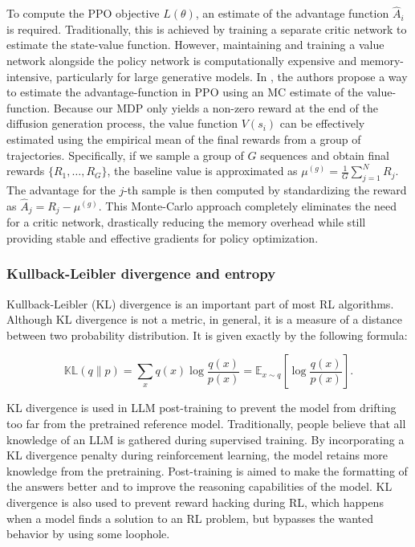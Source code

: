 To compute the PPO objective $L(\theta)$, an estimate of the advantage function $\hat{A}_i$ is required. Traditionally, this is achieved by training a separate critic network to estimate the state-value function. However, maintaining and training a value network alongside the policy network is computationally expensive and memory-intensive, particularly for large generative models. In \cite{shao2024deepseekmathpushinglimitsmathematical}, the authors propose a way to estimate the advantage-function in PPO using an MC estimate of the value-function. Because our MDP only yields a non-zero reward at the end of the diffusion generation process, the value function $V(s_i)$ can be effectively estimated using the empirical mean of the final rewards from a group of trajectories. Specifically, if we sample a group of $G$ sequences and obtain final rewards $\{R_1, \dots, R_G\}$, the baseline value is approximated as $\mu^{(g)} = \frac{1}{G}\sum_{j=1}^N R_j$. The advantage for the $j$-th sample is then computed by standardizing the reward as $\hat{A}_j = R_j - \mu^{(g)}$. This Monte-Carlo approach completely eliminates the need for a critic network, drastically reducing the memory overhead while still providing stable and effective gradients for policy optimization.


\subsubsection{Kullback-Leibler divergence and entropy}
\label{sec:kldivergence and entropy}

Kullback-Leibler (KL) divergence is an important part of most RL algorithms. Although KL divergence is not a metric, in general, it is a measure of a distance between two probability distribution. It is given exactly by the following formula:

\begin{equation*}
    \mathbb{KL}(q \parallel p) = \sum_{x}q(x)\log\frac{q(x)}{p(x)} = \mathbb{E}_{x\sim q}\left[\log\frac{q(x)}{p(x)}\right].
\end{equation*}

KL divergence is used in LLM post-training to prevent the model from drifting too far from the pretrained reference model. Traditionally, people believe that all knowledge of an LLM is gathered during supervised training. By incorporating a KL divergence penalty during reinforcement learning, the model retains more knowledge from the pretraining. Post-training is aimed to make the formatting of the answers better and to improve the reasoning capabilities of the model. KL divergence is also used to prevent reward hacking during RL, which happens when a model finds a solution to an RL problem, but bypasses the wanted behavior by using some loophole.

